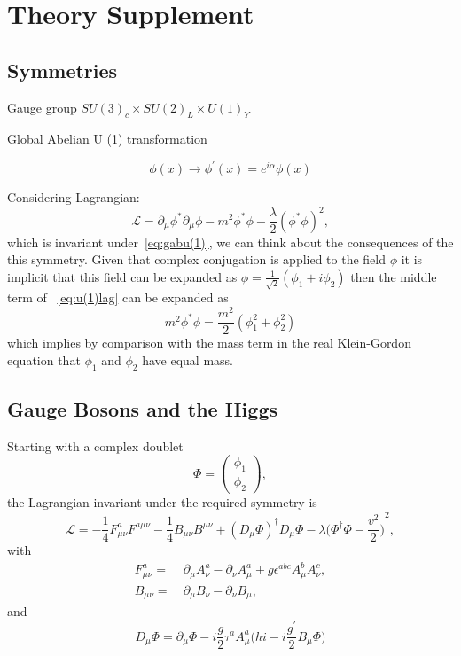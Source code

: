 \chapter{Theory Supplement}%
\label{app:theory}

\section{Symmetries}
Gauge group $SU{(3)}_{c} \times SU{(2)}_{L} \times U{(1)}_{Y}$

Global Abelian U (1) transformation

\begin{equation}
  \phi(x) \rightarrow \phi^{\prime}(x) = e^{i\alpha}\phi(x)
  \label{eq:gabu(1)}
\end{equation}

Considering Lagrangian:
\begin{equation}
  \mathscr{L} = \partial_{\mu}\phi^{*}\partial_{\mu}\phi - m^{2}\phi^{*}\phi -
  \frac{\lambda}{2}{(\phi^{*}\phi)}^{2},
  \label{eq:u(1)lag}
\end{equation}
which is invariant under~\ref{eq:gabu(1)}, we can think about the consequences of the this symmetry.
Given that complex conjugation is applied to the field $\phi$ it is implicit that this field can be
expanded as $\phi = \frac{1}{\sqrt{2}}{(\phi_{1} + i\phi_{2})}$ then the middle term of~%
\ref{eq:u(1)lag} can be expanded as
\begin{equation}
  m^{2}\phi^{*}\phi = \frac{m^{2}}{2}{(\phi_{1}^{2} + \phi_{2}^{2})}
  \label{eq:u(1)lag_mid}
\end{equation}
which implies by comparison with the mass term in the real Klein-Gordon equation that $\phi_{1}$
and $\phi_{2}$ have equal mass.

\section{Gauge Bosons and the Higgs}
Starting with a complex doublet
\begin{equation}
  \Phi = \begin{pmatrix} \phi_{1} \\ \phi_{2} \end{pmatrix},
\end{equation}
the Lagrangian invariant under the required symmetry is
\begin{equation}
  \mathscr{L} = -\frac{1}{4}F_{\mu\nu}^{a}F^{a\mu\nu} -\frac{1}{4}B_{\mu\nu}B^{\mu\nu}
  + {(D_{\mu}\Phi)}^{\dagger}D_{\mu}\Phi - \lambda{\bigg(\Phi^{\dagger}\Phi - \frac{v^{2}}{2}\bigg)}^{2},
\end{equation}
with
\begin{align}
  F_{\mu\nu}^{a} = &~\partial_{\mu}A^{a}_{\nu} - \partial_{\nu}A_{\mu}^{a} +
  g\epsilon^{abc}A^{b}_{\mu}A^{c}_{\nu}, \\
  B_{\mu\nu} = &~\partial_{\mu}B_{\nu} - \partial_{\nu}B_{\mu},
\end{align}
and
\begin{equation}
  D_{\mu}\Phi = \partial_{\mu}\Phi -
  i\frac{g}{2}\tau^{a}A^{a}_{\mu}{\big(hi - i\frac{g^{\prime}}{2}B_{\mu}\Phi\big)}
\end{equation}
